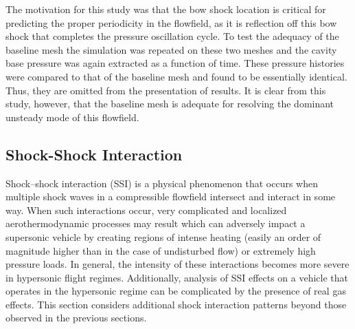  The motivation for this study was that the bow shock location is critical for predicting the proper periodicity in the flowfield, as it is reflection off this bow shock that completes the pressure oscillation cycle.  To test the adequacy of the baseline mesh the simulation was repeated on these two meshes and the cavity base pressure was again extracted as a function of time.  These pressure histories were compared to that of the baseline mesh and found to be essentially identical.  Thus, they are omitted from the presentation of results.  It is clear from this study, however, that the baseline mesh is adequate for resolving the dominant unsteady mode of this flowfield.



\clearpage
\subsection{Shock-Shock Interaction}
Shock--shock interaction (SSI) is a physical phenomenon that occurs when multiple shock waves in a compressible flowfield intersect and interact in some way.  When such interactions occur, very complicated and localized aerothermodynamic processes may result which can adversely impact a supersonic vehicle by creating regions of intense heating (easily an order of magnitude higher than in the case of undisturbed flow) or extremely high pressure loads.  In general, the intensity of these interactions becomes more severe in hypersonic flight regimes.  Additionally, analysis of SSI effects on a vehicle that operates in the hypersonic regime can be complicated by the presence of real gas effects.  This section considers additional shock interaction patterns beyond those observed in the previous sections.

